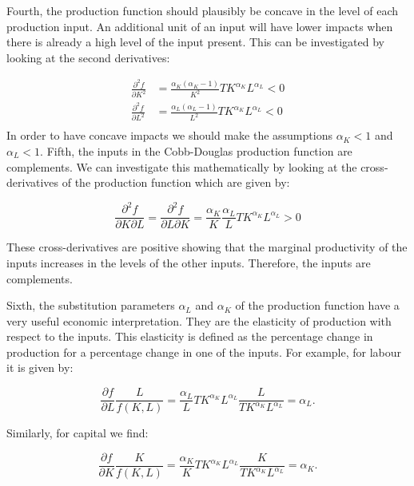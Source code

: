 \documentclass[
]{book}
\begin{document}
Fourth, the production function should plausibly be concave in the level of each production input. An additional unit of an input will have lower impacts when there is already a high level of the input present. This can be investigated by looking at the second derivatives:

\begin{align}
\frac{\partial^2 f}{\partial K^2} &= \frac{\alpha_K(\alpha_K -1)}{ K^2} TK^{\alpha_K}L^{\alpha_L} < 0 \\
\frac{\partial^2 f}{\partial L^2} &= \frac{\alpha_L(\alpha_L - 1)}{ L^2} TK^{\alpha_K}L^{\alpha_L} < 0 \\
\end{align}
In order to have concave impacts we should make the assumptions \(\alpha_K<1\) and \(\alpha_L<1\).
Fifth, the inputs in the Cobb-Douglas production function are complements. We can investigate this mathematically by looking at the cross-derivatives of the production function which are given by:

\begin{equation}
\frac{\partial^2 f}{\partial K \partial L} = \frac{\partial^2 f}{\partial L \partial K} = \frac{\alpha_K}{K}\frac{\alpha_L}{L} TK^{\alpha_K}L^{\alpha_L} >0
\end{equation}

These cross-derivatives are positive showing that the marginal productivity of the inputs increases in the levels of the other inputs. Therefore, the inputs are complements.

Sixth, the substitution parameters \(\alpha_L\) and \(\alpha_K\) of the production function have a very useful economic interpretation. They are the elasticity of production with respect to the inputs. This elasticity is defined as the percentage change in production for a percentage change in one of the inputs. For example, for labour it is given by:

\begin{equation}
\frac{\partial f}{\partial L} \frac{L}{f(K,L)} = \frac{\alpha_L}{L}TK^{\alpha_K}L^{\alpha_L}\frac{L}{TK^{\alpha_K}L^{\alpha_L}} =\alpha_L.
\end{equation}

Similarly, for capital we find:

\begin{equation}
\frac{\partial f}{\partial K} \frac{K}{f(K,L)} = \frac{\alpha_K}{K}TK^{\alpha_K}L^{\alpha_L}\frac{K}{TK^{\alpha_K}L^{\alpha_L}} =\alpha_K.
\end{equation}
\end{document}
